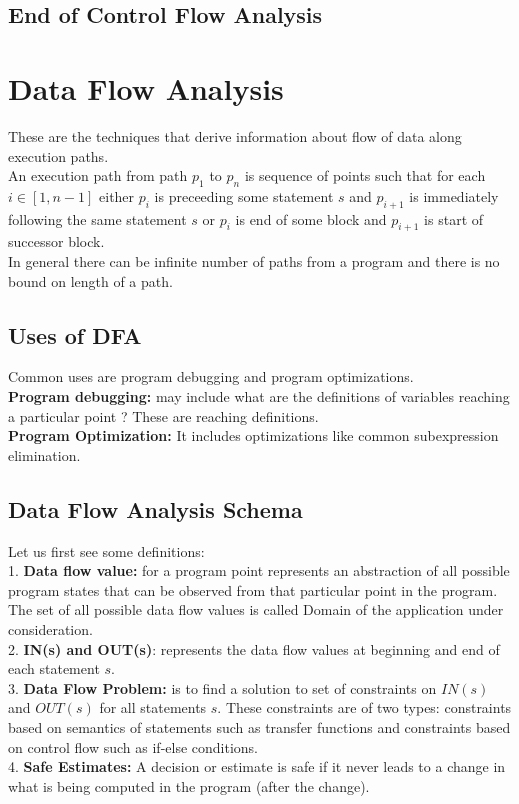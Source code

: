 \documentclass{article}
\begin{document}
\subsection*{End of Control Flow Analysis}

\newpage

\section*{Data Flow Analysis}
These are the techniques that derive information about flow of data along execution paths. \\
An execution path from path $p_1$ to $p_n$ is sequence of points such that for each $i \in [1,n-1]$ either $p_i$ is preceeding some statement $s$ and $p_{i+1}$ is immediately following the same statement $s$ or $p_i$ is end of some block and $p_{i+1}$ is start of successor block. \\
In general there can be infinite number of paths from a program and there is no bound on length of a path. \\

\subsection*{Uses of DFA}
Common uses are program debugging and program optimizations. \\
\textbf{Program debugging: } may include what are the definitions of variables reaching a particular point ? These are reaching definitions. \\
\textbf{Program Optimization: } It includes optimizations like common subexpression elimination. \\

\subsection*{Data Flow Analysis Schema}
Let us first see some definitions: \\
1. \textbf{Data flow value: } for a program point represents an abstraction of all possible program states that can be observed from that particular point in the program. The set of all possible data flow values is called Domain of the application under consideration. \\
2. \textbf{IN(s) and OUT(s)}: represents the data flow values at beginning and end of each statement $s$. \\
3. \textbf{Data Flow Problem:} is to find a solution to set of constraints on $IN(s)$ and $OUT(s)$ for all statements $s$. These constraints are of two types: constraints based on semantics of statements such as transfer functions and constraints based on control flow such as if-else conditions. \\
4. \textbf{Safe Estimates: } A decision or estimate is safe if it never leads to a change in what is being computed in the program (after the change).  \\
\end{document}
